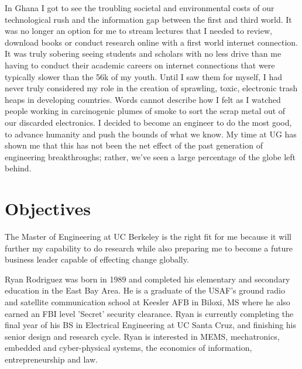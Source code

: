 \documentclass[journal, draftcls]{IEEEtran}
\begin{document}
 In Ghana I got to see the troubling societal and environmental costs of our technological rush and the information gap between the first and third world. It was no longer an option for me to stream lectures that I needed to review, download books or conduct research online with a first world internet connection. It was truly sobering seeing students and scholars with no less drive than me having to conduct their academic careers on internet connections that were typically slower than the 56k of my youth. Until I saw them for myself, I had never truly considered my role in the creation of sprawling, toxic, electronic trash heaps in developing countries. Words cannot describe how I felt as I watched people working in carcinogenic plumes of smoke to sort the scrap metal out of our discarded electronics. I decided to become an engineer to do the most good, to advance humanity and push the bounds of what we know. My time at UG has shown me that this has not been the net effect of the past generation of engineering breakthroughs; rather, we've seen a large percentage of the globe left behind. 

\section{Objectives}

The {Master of Engineering at UC Berkeley} is the right fit for me because it will further my capability to do research while also preparing me to become a future business leader capable of effecting change globally. 
\begin{IEEEbiography}
{Ryan Rodriguez} was born in 1989 and completed his elementary and secondary education in the East Bay Area. He is a graduate of the USAF's ground radio and satellite communication school at Keesler AFB in Biloxi, MS where he also earned an FBI level 'Secret' security clearance. Ryan is currently completing the final year of his BS in Electrical Engineering at UC Santa Cruz, and finishing his senior design and research cycle. Ryan is interested in MEMS, mechatronics, embedded and cyber-physical systems, the economics of information, entrepreneurship and law. 
\end{IEEEbiography}
\end{document}
